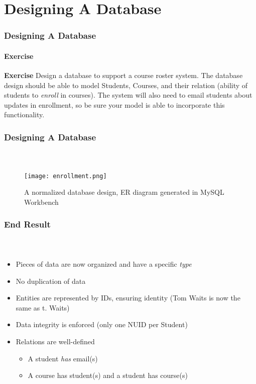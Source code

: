 \documentclass{beamer}
\begin{document}
\begin{frame}[allowframebreaks]
\end{frame}

\section{Designing A Database}

\begin{frame}
  \frametitle{Designing A Database}
  \framesubtitle{Exercise}

\textbf{Exercise}
  Design a database to support a course roster system.  The database design should
  be able to model Students, Courses, and their relation (ability of students to \emph{enroll}
  in courses).  The system will also need to email students about updates in enrollment,
  so be sure your model is able to incorporate this functionality.

\end{frame}

\begin{frame}
  \frametitle{Designing A Database}
  \framesubtitle{~}

  \begin{figure}[h]
  \centering
  \texttt{[image: enrollment.png]}
  \caption{A normalized database design, ER diagram generated in MySQL Workbench}
  \end{figure}

\end{frame}

\begin{frame}
  \frametitle{End Result}
  \framesubtitle{~}

\begin{itemize}
  \item Pieces of data are now organized and have a specific \emph{type}
  \item No duplication of data
  \item Entities are represented by IDs, ensuring identity (Tom Waits is now the same as t. Waits)
  \item Data integrity is enforced (only one NUID per Student)
  \item Relations are well-defined
   \begin{itemize}
     \item A student \emph{has} email(s)
     \item A course has student(s) and a student has course(s)
  \end{itemize}
  \end{itemize}
\end{frame}
\end{document}
